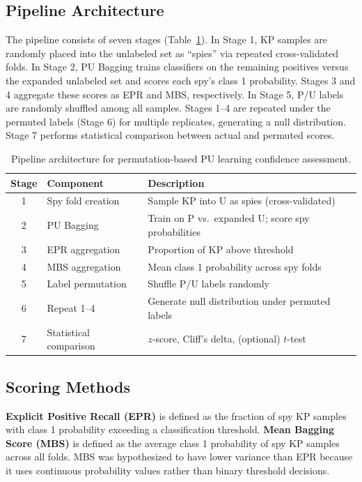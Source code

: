 \documentclass[12pt]{article}
\begin{document}
\subsection{Pipeline Architecture}

The pipeline consists of seven stages (Table~\ref{tab:pipeline}). In Stage 1, KP samples are randomly placed into the unlabeled set as ``spies'' via repeated cross-validated folds. In Stage 2, PU Bagging trains classifiers on the remaining positives versus the expanded unlabeled set and scores each spy's class 1 probability. Stages 3 and 4 aggregate these scores as EPR and MBS, respectively. In Stage 5, P/U labels are randomly shuffled among all samples. Stages 1--4 are repeated under the permuted labels (Stage 6) for multiple replicates, generating a null distribution. Stage 7 performs statistical comparison between actual and permuted scores.

\begin{table}[ht]
\centering
\caption{Pipeline architecture for permutation-based PU learning confidence assessment.}
\label{tab:pipeline}
\begin{tabular}{cll}
\toprule
Stage & Component & Description \\
\midrule
1 & Spy fold creation & Sample KP into U as spies (cross-validated) \\
2 & PU Bagging & Train on P vs.\ expanded U; score spy probabilities \\
3 & EPR aggregation & Proportion of KP above threshold \\
4 & MBS aggregation & Mean class 1 probability across spy folds \\
5 & Label permutation & Shuffle P/U labels randomly \\
6 & Repeat 1--4 & Generate null distribution under permuted labels \\
7 & Statistical comparison & $z$-score, Cliff's delta, (optional) $t$-test \\
\bottomrule
\end{tabular}
\end{table}

\subsection{Scoring Methods}

\textbf{Explicit Positive Recall (EPR)} is defined as the fraction of spy KP samples with class 1 probability exceeding a classification threshold. \textbf{Mean Bagging Score (MBS)} is defined as the average class 1 probability of spy KP samples across all folds. MBS was hypothesized to have lower variance than EPR because it uses continuous probability values rather than binary threshold decisions.
\end{document}
